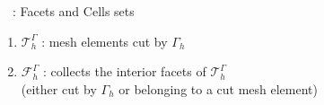 \begin{frame}{\appendixname~\theappendixframenumber~: Facets and Cells sets}
	
	\vspace{15pt}
	
	\begin{center}
		\begin{minipage}{0.48\linewidth}
			\centering
		\end{minipage} \hfill
		\begin{minipage}{0.48\linewidth}
			\centering
		\end{minipage}
	\end{center}
	
	\begin{enumerate}[\ding{217}]
		\item $\mathcal{T}_h^\Gamma$ : mesh elements cut by $\Gamma_h$
		\item $\mathcal{F}_h^\Gamma$ : collects the interior facets of $\mathcal{T}_h^\Gamma$ \\
		(either cut by $\Gamma_h$ or belonging to a cut mesh element)
	\end{enumerate}
	
\end{frame}

